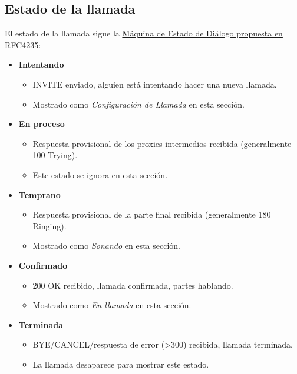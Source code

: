\documentclass[letterpaper,10pt,spanish]{sphinxmanual}
\begin{document}
\subsection{Estado de la llamada}
\label{administration_portal/platform/active_calls:id2}
El estado de la llamada sigue la \href{https://tools.ietf.org/html/rfc4235\#section-3.7.1}{Máquina de Estado de Diálogo propuesta en RFC4235}:
\begin{itemize}
\item {} 
\textbf{Intentando}
\begin{itemize}
\item {} 
INVITE enviado, alguien está intentando hacer una nueva llamada.

\item {} 
Mostrado como \emph{Configuración de Llamada} en esta sección.

\end{itemize}

\item {} 
\textbf{En proceso}
\begin{itemize}
\item {} 
Respuesta provisional de los proxies intermedios recibida (generalmente 100 Trying).

\item {} 
Este estado se ignora en esta sección.

\end{itemize}

\item {} 
\textbf{Temprano}
\begin{itemize}
\item {} 
Respuesta provisional de la parte final recibida (generalmente 180 Ringing).

\item {} 
Mostrado como \emph{Sonando} en esta sección.

\end{itemize}

\item {} 
\textbf{Confirmado}
\begin{itemize}
\item {} 
200 OK recibido, llamada confirmada, partes hablando.

\item {} 
Mostrado como \emph{En llamada} en esta sección.

\end{itemize}

\item {} 
\textbf{Terminada}
\begin{itemize}
\item {} 
BYE/CANCEL/respuesta de error (\textgreater{}300) recibida, llamada terminada.

\item {} 
La llamada desaparece para mostrar este estado.

\end{itemize}

\end{itemize}
\end{document}
